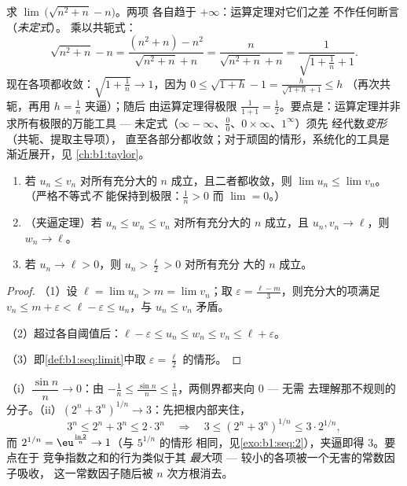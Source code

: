 \begin{example}[运算法则加一个代数技巧]\label{ex:b1:seq:conjugatetrick}
求 $\lim\,\bigl(\sqrt{n^2 + n} - n\bigr)$。两项
各自趋于 $+\infty$：运算定理对它们之差
不作任何断言（\emph{未定式}）。
乘以共轭式：
\[
\sqrt{n^2 + n} - n
= \frac{(n^2 + n) - n^2}{\sqrt{n^2 + n} + n}
= \frac{n}{\sqrt{n^2+n} + n}
= \frac{1}{\sqrt{1 + \frac1n} + 1} .
\]
现在各项都收敛：$\sqrt{1 + \frac1n} \to 1$，因为
$0 \leq \sqrt{1 + h} - 1 = \frac{h}{\sqrt{1+h} + 1} \leq h$
（再次共轭，再用 $h = \frac1n$ 夹逼）；随后
由运算定理得极限 $\frac{1}{1 + 1} =
\frac12$。要点是：运算定理并非
求所有极限的万能工具 --- 未定式（$\infty -
\infty$、$\frac00$、$0 \times \infty$、$1^\infty$）须先
经代数\emph{变形}（共轭、提取主导项），
直至各部分都收敛；对于顽固的情形，系统化的工具是
渐近展开，见
\cref{ch:b1:taylor}。
\end{example}

\begin{theorem}[极限与序关系]\label{thm:b1:seq:order}
\begin{enumerate}
  \item 若 $u_n \leq v_n$ 对所有充分大的 $n$ 成立，且二者都收敛，则
        $\lim u_n \leq \lim v_n$。（严格不等式\emph{不}
        能保持到极限：$\frac 1n > 0$ 而 $\lim = 0$。）
  \item （夹逼定理）若 $u_n \leq w_n
        \leq v_n$ 对所有充分大的 $n$ 成立，且 $u_n, v_n \to \ell$，则
        $w_n \to \ell$。
  \item 若 $u_n \to \ell > 0$，则 $u_n > \frac\ell2 > 0$ 对所有充分
        大的 $n$ 成立。
\end{enumerate}
\end{theorem}

\begin{proof}
（1）设 $\ell = \lim u_n > m = \lim v_n$；取 $\varepsilon =
\frac{\ell - m}{3}$，则充分大的项满足 $v_n \leq m + \varepsilon <
\ell - \varepsilon \leq u_n$，与 $u_n \leq v_n$ 矛盾。

（2）超过各自阈值后：$\ell - \varepsilon \leq u_n \leq w_n \leq
v_n \leq \ell + \varepsilon$。

（3）即\cref{def:b1:seq:limit}中取 $\varepsilon = \frac\ell2$ 的情形。
\end{proof}

\begin{example}[两次夹逼]\label{ex:b1:seq:squeezes}
（i）$\dfrac{\sin n}{n} \to 0$：由 $-\frac1n \leq \frac{\sin
n}{n} \leq \frac1n$，两侧界都夹向 $0$ --- 无需
去理解那不规则的分子。（ii）$(2^n +
3^n)^{1/n} \to 3$：先把根内部夹住，
\[
3^n \leq 2^n + 3^n \leq 2\cdot3^n
\quad\Longrightarrow\quad
3 \leq (2^n + 3^n)^{1/n} \leq 3\cdot 2^{1/n} ,
\]
而 $2^{1/n} = \eu^{\frac{\ln 2}{n}} \to 1$（与 $5^{1/n}$ 的情形
相同，见\cref{exo:b1:seq:2}），夹逼即得 $3$。要点在于
竞争指数之和的行为类似于其
\emph{最大}项 --- 较小的各项被一个无害的常数因子吸收，
这一常数因子随后被 $n$ 次方根消去。
\end{example}

